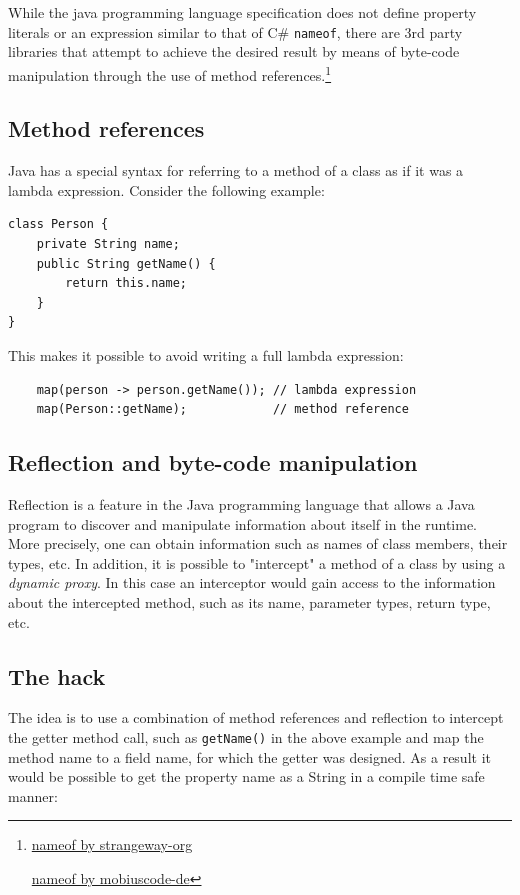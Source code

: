 While the java programming language specification does not define property literals or an expression similar to that of C\# \texttt{nameof}, there are 3rd party libraries that attempt to achieve the desired result by means of byte-code manipulation through the use of method references.\footnote{\href{https://github.com/strangeway-org/nameof}{nameof by strangeway-org}

\; \; \href{https://github.com/mobiuscode-de/nameof}{nameof by mobiuscode-de}}


\subsection{Method references}
Java has a special syntax for referring to a method of a class as if it was a lambda expression. Consider the following example: 

\begin{verbatim}
class Person {
    private String name;
    public String getName() {
        return this.name;
    }
}
\end{verbatim}

This makes it possible to avoid writing a full lambda expression:
\begin{verbatim}
    map(person -> person.getName()); // lambda expression
    map(Person::getName);            // method reference
\end{verbatim}

\subsection{Reflection and byte-code manipulation}
Reflection is a feature in the Java programming language that allows a Java program to discover and manipulate information about itself in the runtime. More precisely, one can obtain information such as names of class members, their types, etc. In addition, it is possible to "intercept" a method of a class by using a \textit{dynamic proxy}. In this case an interceptor would gain access to the information about the intercepted method, such as its name, parameter types, return type, etc.

\subsection{The hack}
The idea is to use a combination of method references and reflection to intercept the getter method call, such as \texttt{getName()} in the above example and map the method name to a field name, for which the getter was designed. As a result it would be possible to get the property name as a String in a compile time safe manner:

